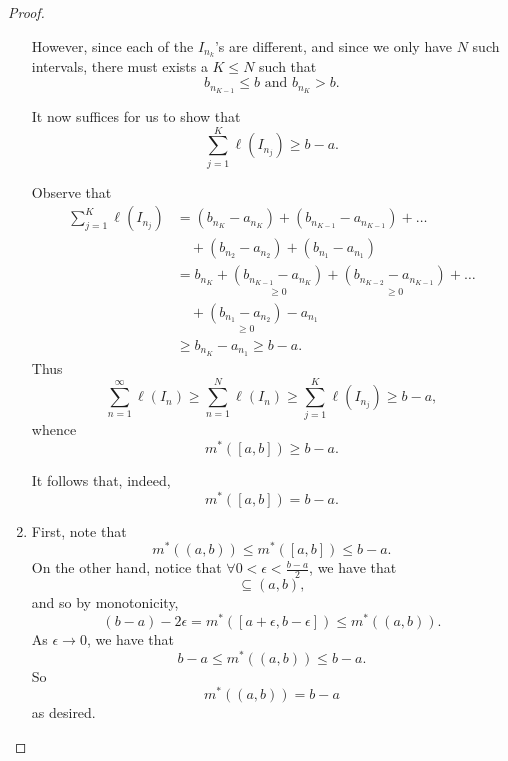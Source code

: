 \documentclass[notoc,notitlepage]{tufte-book}
\begin{document}
\begin{proof}
\begin{enumerate}
      However, since each of the $I_{n_k}$'s are different, and since we only
      have $N$ such intervals, there must exists a $K \leq N$ such that
      \begin{equation*}
        b_{n_{K-1}} \leq b \text{ and } b_{n_K} > b.
      \end{equation*}

      It now suffices for us to show that
      \begin{equation*}
        \sum_{j=1}^{K} \ell(I_{n_j}) \geq b - a.
      \end{equation*}

      Observe that
      \begin{align*}
        \sum_{j=1}^{K} \ell(I_{n_j})
        &= (b_{n_K} - a_{n_K}) + (b_{n_{K-1}} - a_{n_{K-1}}) + \hdots \\
        &\quad + (b_{n_2} - a_{n_2}) + (b_{n_1} - a_{n_1}) \\
        &= b_{n_K} + \underset{\geq 0}{(b_{n_{K-1}} - a_{n_K})} + \underset{\geq
          0}{(b_{n_{K-2}} - a_{n_{K-1}})} + \hdots \\
        &\quad + \underset{\geq 0}{(b_{n_1} - a_{n_2})} - a_{n_1} \\
        &\geq b_{n_K} - a_{n_1} \geq b - a.
      \end{align*}
      Thus
      \begin{equation*}
        \sum_{n=1}^{\infty} \ell(I_n) \geq \sum_{n=1}^{N} \ell(I_n) \geq
        \sum_{j=1}^{K} \ell(I_{n_j}) \geq b - a,
      \end{equation*}
      whence
      \begin{equation*}
        m^*([a, b]) \geq b - a.
      \end{equation*}

      It follows that, indeed,
      \begin{equation*}
        m^*([a, b]) = b - a.
      \end{equation*}

    \item First, note that
      \begin{equation*}
        m^*((a, b)) \leq m^*([a, b]) \leq b - a.
      \end{equation*}
      On the other hand, notice that $\forall 0 < \epsilon < \frac{b - a}{2}$,
      we have that
      \begin{equation*}
        [a + \epsilon, b - \epsilon] \subseteq (a, b),
      \end{equation*}
      and so by monotonicity,
      \begin{equation*}
        (b - a) - 2 \epsilon = m^*([a + \epsilon, b - \epsilon]) \leq m^*((a,
        b)).
      \end{equation*}
      As $\epsilon \to 0$, we have that
      \begin{equation*}
        b - a \leq m^*((a, b)) \leq b - a.
      \end{equation*}
      So
      \begin{equation*}
        m^*((a, b)) = b - a
      \end{equation*}
      as desired.


\end{enumerate}
\end{proof}
\end{document}
